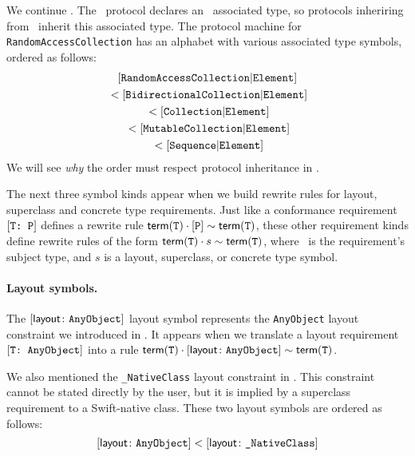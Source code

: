 \documentclass[../generics]{subfiles}
\begin{document}
\begin{example}
We continue . The \tSequence\ protocol declares an \nElement\ associated type, so protocols inheriring from \tSequence\ inherit this associated type. The protocol machine for \texttt{RandomAccessCollection} has an alphabet with various associated type symbols, ordered as follows:
\begin{gather*}
[\texttt{RandomAccessCollection}|\texttt{Element}]\\
{} < [\texttt{BidirectionalCollection}|\texttt{Element}]\\
{} < [\texttt{Collection}|\texttt{Element}]\\
{} < [\texttt{MutableCollection}|\texttt{Element}]\\
{} < [\texttt{Sequence}|\texttt{Element}]
\end{gather*}
We will see \emph{why} the order must respect protocol inheritance in .
\end{example}

\medskip

The next three symbol kinds appear when we build rewrite rules for layout, superclass and concrete type requirements. Just like a conformance requirement $[\texttt{T:~P}]$ defines a rewrite rule $\mathsf{term}(\texttt{T})\cdot[\texttt{P}]\sim\mathsf{term}(\texttt{T})$, these other requirement kinds define rewrite rules of the form $\mathsf{term}(\texttt{T})\cdot s\sim\mathsf{term}(\texttt{T})$, where \tT\ is the requirement's subject type, and $s$ is a layout, superclass, or concrete type symbol.

\paragraph{Layout symbols.} The $[\mathsf{layout}\colon\texttt{AnyObject}]$ layout symbol represents the \texttt{AnyObject} layout constraint we introduced in . It appears when we translate a layout requirement $[\texttt{T:~AnyObject}]$ into a rule $\mathsf{term}(\texttt{T})\cdot[\mathsf{layout}\colon\texttt{AnyObject}] \sim \mathsf{term}(\texttt{T})$.

We also mentioned the \verb|_NativeClass| layout constraint in . This constraint cannot be stated directly by the user, but it is implied by a superclass requirement to a Swift-native class. These two layout symbols are ordered as follows:
\[\layoutsym{AnyObject} < \layoutsym{\char`_NativeClass}\]
\end{document}

